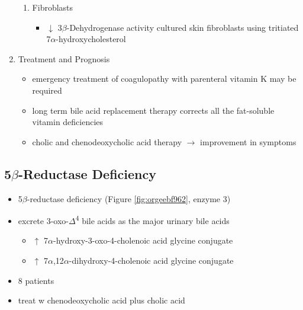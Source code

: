 \documentclass{scrartcl}
\begin{document}
\begin{enumerate}
\begin{enumerate}
\item Fibroblasts
\label{sec:orgc98c490}
\begin{itemize}
\item \(\downarrow\) 3\(\beta\)-Dehydrogenase activity cultured skin fibroblasts using
tritiated 7\(\alpha\)-hydroxycholesterol
\end{itemize}
\end{enumerate}

\item Treatment and Prognosis
\label{sec:org745f54d}
\begin{itemize}
\item emergency treatment of coagulopathy with parenteral vitamin K may be required
\item long term bile acid replacement therapy corrects all the fat-soluble
vitamin deficiencies

\item cholic and chenodeoxycholic acid therapy \(\to\) improvement in symptoms
\end{itemize}
\end{enumerate}

\subsection{5\(\beta\)-Reductase Deficiency}
\label{sec:orgb0e967e}
\begin{itemize}
\item 5\(\beta\)-reductase deficiency (Figure \ref{fig:orgeebf962}, enzyme 3)
\item excrete 3-oxo-\(\Delta\)\textsuperscript{4} bile acids as the major urinary bile acids
\begin{itemize}
\item \(\uparrow\) 7\(\alpha\)-hydroxy-3-oxo-4-cholenoic acid glycine conjugate
\item \(\uparrow\) 7\(\alpha\),12\(\alpha\)-dihydroxy-4-cholenoic acid glycine conjugate
\end{itemize}
\item 8 patients
\item treat w chenodeoxycholic acid plus cholic acid
\end{itemize}
\end{document}
